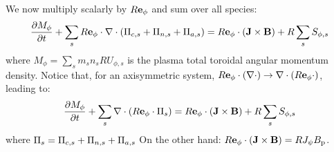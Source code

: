 We now multiply scalarly  by $R\mathbf{e}_{\phi}$ and sum over all species:
\begin{eqnarray}
 \frac{\partial M_\phi}{\partial{t}}+\sum_s R\mathbf{e}_{\phi}\cdot
\nabla\cdot\left(\Pi_{c,s}
+\Pi_{n,s}+\Pi_{a,s}\right)=R\mathbf{e}_{\phi}\cdot\left(
\mathbf{J}\times\mathbf{B}\right) + R \sum_s S_{\phi,s}
\label{momtranspeq3drephi}
\end{eqnarray}
where $M_{\phi}=\sum_s m_s n_s R U_{\phi,s}$ is the plasma total toroidal angular momentum density.
Notice that, for an axisymmetric system, $R\mathbf{e}_{\phi}\cdot(\nabla\cdot) \rightarrow \nabla\cdot (R \mathbf{e}_{\phi}\cdot)$, leading to:
\begin{eqnarray}
 \frac{\partial M_\phi}{\partial{t}}+
\sum_s \nabla\cdot\left(R\mathbf{e}_{\phi}\cdot\Pi_s\right)=R\mathbf{e}_{\phi}\cdot\left(
\mathbf{J}\times\mathbf{B}\right)  + R \sum_s S_{\phi,s}
\label{momtranspeq3drephi2}
\end{eqnarray}
where $\Pi_s=\Pi_{c,s}+\Pi_{n,s}+\Pi_{a,s}$
On the other hand: $R\mathbf{e}_{\phi}\cdot\left(
\mathbf{J}\times\mathbf{B}\right)=R J_\psi B_{\rm p}$. 


